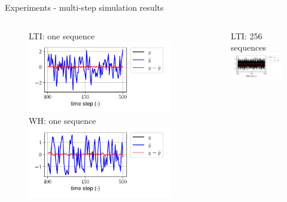 \documentclass{beamer}
\begin{document}
\begin{frame}{Experiments - multi-step simulation results}
\begin{columns}[t]
\begin{center}
\begin{figure}
LTI: one sequence
\includegraphics[width=\textwidth]{fig/lin_sim_single.pdf} 
WH: one sequence
\includegraphics[width=\textwidth]{fig/wh_sim_single.pdf} 
\end{figure}
\end{center}
\begin{center}
\begin{figure}
LTI: 256 sequences
\includegraphics[width=\textwidth]{fig/lin_sim_batch.pdf} 

\end{figure}
\end{center}
\end{columns}
\end{frame}
\end{document}
